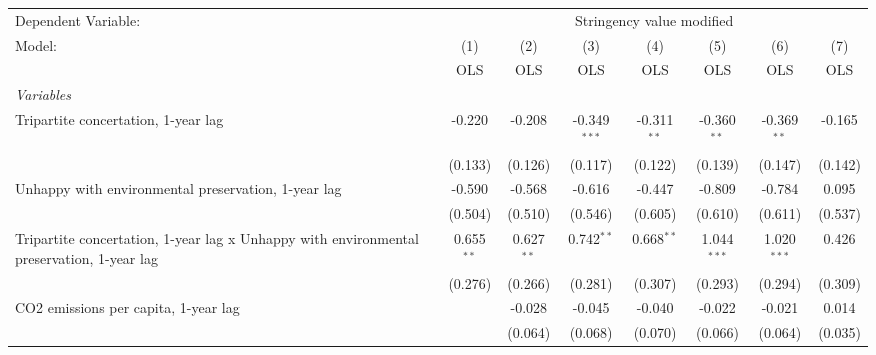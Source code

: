 
\begingroup
\centering
\begin{tabular}{lccccccc}
   \toprule
   Dependent Variable: & \multicolumn{7}{c}{Stringency value modified}\\
   Model:                                                                                    & (1)          & (2)          & (3)            & (4)           & (5)           & (6)           & (7)\\  
                                                                                             &  OLS         & OLS          & OLS            & OLS           & OLS           & OLS           & OLS\\  
   \midrule
   \emph{Variables}\\
   Tripartite concertation, 1-year lag                                                       & -0.220       & -0.208       & -0.349$^{***}$ & -0.311$^{**}$ & -0.360$^{**}$ & -0.369$^{**}$ & -0.165\\   
                                                                                             & (0.133)      & (0.126)      & (0.117)        & (0.122)       & (0.139)       & (0.147)       & (0.142)\\   
   Unhappy with environmental preservation, 1-year lag                                       & -0.590       & -0.568       & -0.616         & -0.447        & -0.809        & -0.784        & 0.095\\   
                                                                                             & (0.504)      & (0.510)      & (0.546)        & (0.605)       & (0.610)       & (0.611)       & (0.537)\\   
   Tripartite concertation, 1-year lag x Unhappy with environmental preservation, 1-year lag & 0.655$^{**}$ & 0.627$^{**}$ & 0.742$^{**}$   & 0.668$^{**}$  & 1.044$^{***}$ & 1.020$^{***}$ & 0.426\\   
                                                                                             & (0.276)      & (0.266)      & (0.281)        & (0.307)       & (0.293)       & (0.294)       & (0.309)\\   
   CO2 emissions per capita, 1-year lag                                                      &              & -0.028       & -0.045         & -0.040        & -0.022        & -0.021        & 0.014\\   
                                                                                             &              & (0.064)      & (0.068)        & (0.070)       & (0.066)       & (0.064)       & (0.035)\\   

\end{tabular}
